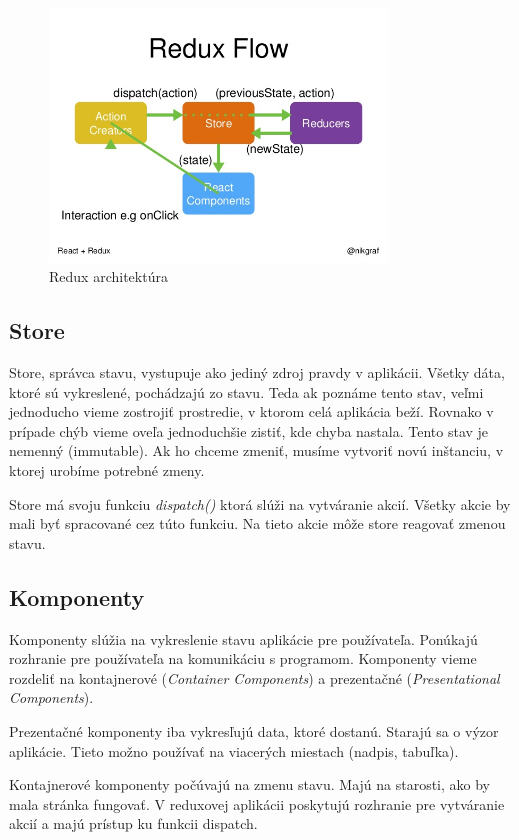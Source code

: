 \begin{figure}
  \centering
    \includegraphics[width=0.8\textwidth]{./images/redux.jpg}
  \caption{Redux architektúra \cite{ReduxObr}}\label{obr:redux}
\end{figure}

\subsection{Store}
Store, správca stavu, vystupuje ako jediný zdroj pravdy v aplikácii. Všetky dáta, ktoré sú vykreslené, pochádzajú zo stavu. Teda ak poznáme tento stav, veľmi jednoducho vieme zostrojiť prostredie, v ktorom celá aplikácia beží. Rovnako v prípade chýb vieme oveľa jednoduchšie zistiť, kde chyba nastala. Tento stav je nemenný (immutable). Ak ho chceme zmeniť, musíme vytvoriť novú inštanciu, v ktorej urobíme potrebné zmeny.

Store má svoju funkciu \emph{dispatch()} ktorá slúži na vytváranie akcií. Všetky akcie by mali byť spracované cez túto funkciu. Na tieto akcie môže store reagovať zmenou stavu.

\subsection{Komponenty}
Komponenty slúžia na vykreslenie stavu aplikácie pre používateľa. Ponúkajú rozhranie pre používateľa na komunikáciu s programom. Komponenty vieme rozdeliť na kontajnerové (\emph{Container Components}) a prezentačné (\emph{Presentational Components}).

Prezentačné komponenty iba vykresľujú data, ktoré dostanú. Starajú sa o výzor aplikácie. Tieto možno používať na viacerých miestach (nadpis, tabuľka). 

Kontajnerové komponenty počúvajú na zmenu stavu. Majú na starosti, ako by mala stránka fungovať. V reduxovej aplikácii poskytujú rozhranie pre vytváranie akcií a majú prístup ku funkcii dispatch.

